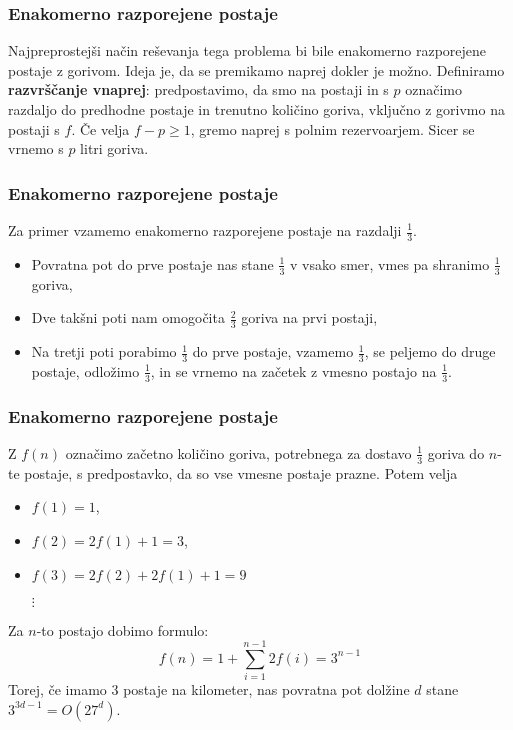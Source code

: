 \documentclass{beamer}
\begin{document}
 \begin{frame}
    \frametitle{Enakomerno razporejene postaje}
    Najpreprostejši način reševanja tega problema bi bile enakomerno razporejene postaje z gorivom. Ideja je, da se
    premikamo naprej dokler je možno. Definiramo \textbf{razvrščanje vnaprej}: predpostavimo, da smo na postaji in s $p$ 
    označimo razdaljo do predhodne postaje in trenutno količino goriva, vključno z gorivmo na postaji s $f$. Če velja 
    $f - p \geq 1$, gremo naprej s polnim rezervoarjem. Sicer se vrnemo s $p$ litri goriva. 
\end{frame}


 \begin{frame}
    \frametitle{Enakomerno razporejene postaje}
    Za primer vzamemo enakomerno razporejene postaje na razdalji $\frac{1}{3}$.
    \begin{itemize}
        \item Povratna pot do prve postaje nas stane $\frac{1}{3}$ v vsako smer, vmes pa shranimo $\frac{1}{3}$ goriva,
        \item Dve takšni poti nam omogočita $\frac{2}{3}$ goriva na prvi postaji,
        \item Na tretji poti porabimo $\frac{1}{3}$ do prve postaje, vzamemo $\frac{1}{3}$, se peljemo do 
                druge postaje, odložimo $\frac{1}{3}$, in se vrnemo na začetek z vmesno postajo na $\frac{1}{3}$.
    \end{itemize}

\end{frame}


 \begin{frame}
    \frametitle{Enakomerno razporejene postaje}
    Z $f(n)$ označimo začetno količino goriva, potrebnega za dostavo $\frac{1}{3}$ goriva do $n$-te 
    postaje, s predpostavko, da so vse vmesne postaje prazne. Potem velja
    \begin{itemize}
        \item $f(1) = 1$,
        \item $f(2) = 2 f(1) + 1 = 3$,
        \item $f(3) = 2 f(2) + 2 f(1) + 1 = 9$
        \item[{$\vdots$}]
    \end{itemize}
    Za $n$-to postajo dobimo formulo:
        $$f(n) = 1 + \sum_{i=1}^{n-1} 2f(i) = 3^{n-1}$$
    Torej, če imamo $3$ postaje na kilometer, nas povratna pot dolžine $d$ stane $3^{3d-1} = O(27^d)$.
\end{frame}
\end{document}
